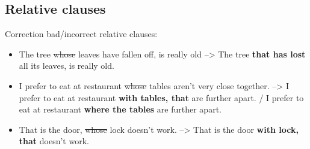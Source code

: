 \documentclass[10pt,a4paper]{article}
\newlength{\OriginalParIndent}
\newenvironment{ItemizeWithOrigParIndent}
    {\begin{itemize}[leftmargin=\OriginalParIndent]}
    {\end{itemize}}
\begin{document}
\subsection{Relative clauses}

Correction bad/incorrect relative clauses:
\begin{ItemizeWithOrigParIndent}
  \item The tree \sout{whose} leaves have fallen off, is really old --> The tree \textbf{that has lost} all its
  leaves, is really old.
  \item I prefer to eat at restaurant \sout{whose} tables aren't very close together. --> I prefer to eat at restaurant \textbf{with tables, that} are further apart. / I prefer to eat at restaurant \textbf{where the tables} are further apart.
  \item That is the door, \sout{whose} lock doesn't work. --> That is the door \textbf{with lock, that} doesn't work.
\end{ItemizeWithOrigParIndent}





\end{document}
